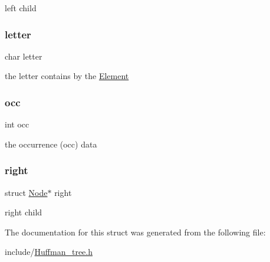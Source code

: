 left child \mbox{\label{struct_node_ac632f0e58c93e01b2bfbb3015c8de34f}} 
\subsubsection{\texorpdfstring{letter}{letter}}
{\footnotesize\ttfamily char letter}

the letter contains by the \hyperlink{struct_element}{Element} \mbox{\label{struct_node_af31c4cdd2ddb799512125a78038c283f}} 
\subsubsection{\texorpdfstring{occ}{occ}}
{\footnotesize\ttfamily int occ}

the occurrence (occ) data \mbox{\label{struct_node_a760682e46f54442d313a05d18095b52f}} 
\subsubsection{\texorpdfstring{right}{right}}
{\footnotesize\ttfamily struct \hyperlink{struct_node}{Node}$\ast$ right}

right child 

The documentation for this struct was generated from the following file\+:\begin{DoxyCompactItemize}
\item 
include/\hyperlink{_huffman__tree_8h}{Huffman\+\_\+tree.\+h}\end{DoxyCompactItemize}
